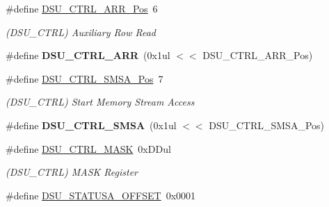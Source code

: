 \begin{DoxyCompactItemize}
\item 
\hypertarget{group___s_a_m_l21___d_s_u_ga73ceacd04bd9669ed1853da944fa0c4a}{}\#define \hyperlink{group___s_a_m_l21___d_s_u_ga73ceacd04bd9669ed1853da944fa0c4a}{D\+S\+U\+\_\+\+C\+T\+R\+L\+\_\+\+A\+R\+R\+\_\+\+Pos}~6\label{group___s_a_m_l21___d_s_u_ga73ceacd04bd9669ed1853da944fa0c4a}

\begin{DoxyCompactList}\small\item\em (D\+S\+U\+\_\+\+C\+T\+R\+L) Auxiliary Row Read \end{DoxyCompactList}\item 
\hypertarget{group___s_a_m_l21___d_s_u_ga5f2577836c76675ccc10c18819e11f39}{}\#define {\bfseries D\+S\+U\+\_\+\+C\+T\+R\+L\+\_\+\+A\+R\+R}~(0x1ul $<$$<$ D\+S\+U\+\_\+\+C\+T\+R\+L\+\_\+\+A\+R\+R\+\_\+\+Pos)\label{group___s_a_m_l21___d_s_u_ga5f2577836c76675ccc10c18819e11f39}

\item 
\hypertarget{group___s_a_m_l21___d_s_u_gae5bcaa4f2c2619c8cedb1672a23bb902}{}\#define \hyperlink{group___s_a_m_l21___d_s_u_gae5bcaa4f2c2619c8cedb1672a23bb902}{D\+S\+U\+\_\+\+C\+T\+R\+L\+\_\+\+S\+M\+S\+A\+\_\+\+Pos}~7\label{group___s_a_m_l21___d_s_u_gae5bcaa4f2c2619c8cedb1672a23bb902}

\begin{DoxyCompactList}\small\item\em (D\+S\+U\+\_\+\+C\+T\+R\+L) Start Memory Stream Access \end{DoxyCompactList}\item 
\hypertarget{group___s_a_m_l21___d_s_u_ga83eade410db4dba9e0ae9930b67e1d4c}{}\#define {\bfseries D\+S\+U\+\_\+\+C\+T\+R\+L\+\_\+\+S\+M\+S\+A}~(0x1ul $<$$<$ D\+S\+U\+\_\+\+C\+T\+R\+L\+\_\+\+S\+M\+S\+A\+\_\+\+Pos)\label{group___s_a_m_l21___d_s_u_ga83eade410db4dba9e0ae9930b67e1d4c}

\item 
\hypertarget{group___s_a_m_l21___d_s_u_gad7cc167d8a8791942e3149bd93278134}{}\#define \hyperlink{group___s_a_m_l21___d_s_u_gad7cc167d8a8791942e3149bd93278134}{D\+S\+U\+\_\+\+C\+T\+R\+L\+\_\+\+M\+A\+S\+K}~0x\+D\+Dul\label{group___s_a_m_l21___d_s_u_gad7cc167d8a8791942e3149bd93278134}

\begin{DoxyCompactList}\small\item\em (D\+S\+U\+\_\+\+C\+T\+R\+L) M\+A\+S\+K Register \end{DoxyCompactList}\item 
\hypertarget{group___s_a_m_l21___d_s_u_ga5bbcb19f47173c3bdee8ce58b612eac0}{}\#define \hyperlink{group___s_a_m_l21___d_s_u_ga5bbcb19f47173c3bdee8ce58b612eac0}{D\+S\+U\+\_\+\+S\+T\+A\+T\+U\+S\+A\+\_\+\+O\+F\+F\+S\+E\+T}~0x0001\label{group___s_a_m_l21___d_s_u_ga5bbcb19f47173c3bdee8ce58b612eac0}


\end{DoxyCompactItemize}
